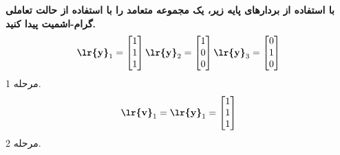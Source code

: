 \documentclass[a4paper,12pt]{report}
\begin{document}
         \hspace{-2cm}\textbf{}
         \textbf
         {
         	با استفاده از بردارهای پایه زیر، یک مجموعه متعامد را با استفاده از حالت تعاملی گرام-اشمیت پیدا کنید.
         }         
         $$
         \textbf{\lr{y}}_1=
         \begin{bmatrix}
         	1 \\ 1 \\ 1
         \end{bmatrix}
         \textbf{\lr{y}}_2=
         \begin{bmatrix}
         	1 \\ 0 \\ 0
         \end{bmatrix}
         \textbf{\lr{y}}_3=
         \begin{bmatrix}
         	0 \\ 1 \\ 0
         \end{bmatrix}
         $$
         مرحله 1.
         $$
         \textbf{\lr{v}}_1=\textbf{\lr{y}}_1=
         \begin{bmatrix}
         	1 \\ 1 \\ 1
         \end{bmatrix}
         $$
         مرحله 2.
\end{document}
